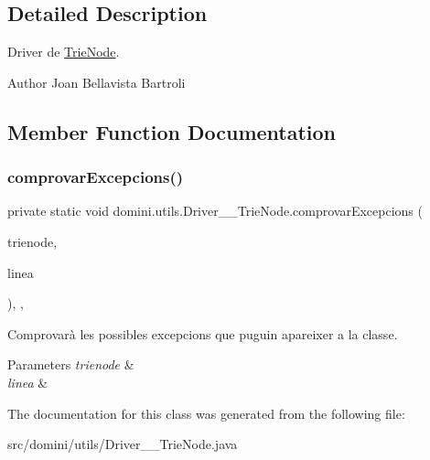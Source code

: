 \subsection{Detailed Description}
Driver de \hyperlink{classdomini_1_1utils_1_1TrieNode}{Trie\+Node}. 

\begin{DoxyAuthor}{Author}
Joan Bellavista Bartroli 
\end{DoxyAuthor}


\subsection{Member Function Documentation}
\mbox{\label{classdomini_1_1utils_1_1Driver____TrieNode_a283501ee0ecd67255b0a4a8c0404a07a}} 
\subsubsection{\texorpdfstring{comprovar\+Excepcions()}{comprovarExcepcions()}}
{\footnotesize\ttfamily private static void domini.\+utils.\+Driver\+\_\+\+\_\+\+Trie\+Node.\+comprovar\+Excepcions (\begin{DoxyParamCaption}\item[{\hyperlink{classdomini_1_1utils_1_1TrieNode}{Trie\+Node}}]{trienode,  }\item[{String}]{linea }\end{DoxyParamCaption})\hspace{0.3cm}{\ttfamily [inline]}, {\ttfamily [static]}, {\ttfamily [private]}}



Comprovarà les possibles excepcions que puguin apareixer a la classe. 


\begin{DoxyParams}{Parameters}
{\em trienode} & \\
\hline
{\em linea} & \\
\hline
\end{DoxyParams}


The documentation for this class was generated from the following file\+:\begin{DoxyCompactItemize}
\item 
src/domini/utils/Driver\+\_\+\+\_\+\+Trie\+Node.\+java\end{DoxyCompactItemize}
